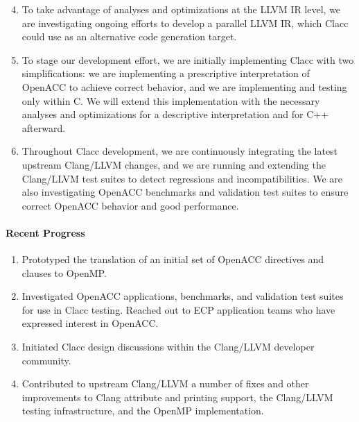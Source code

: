 \begin{enumerate}

\setcounter{enumi}{3}

\item To take advantage of analyses and optimizations at the LLVM IR level,
we are investigating ongoing efforts to develop a parallel LLVM IR, which
Clacc could use as an alternative code generation target.

\item To stage our development effort, we are initially implementing Clacc
with two simplifications: we are implementing a prescriptive interpretation
of OpenACC to achieve correct behavior, and we are implementing and testing
only within C.  We will extend this implementation with the necessary
analyses and optimizations for a descriptive interpretation and for C++
afterward.  

\item Throughout Clacc development, we are continuously integrating the
latest upstream Clang/LLVM changes, and we are running and extending the
Clang/LLVM test suites to detect regressions and incompatibilities.  We are
also investigating OpenACC benchmarks \cite{specAccel} and validation test
suites \cite{openACCValidationSuite} to ensure correct OpenACC behavior and
good performance.


\end{enumerate}


\paragraph{Recent Progress}

\begin{enumerate}

\item Prototyped the translation of an initial set of OpenACC directives and
clauses to OpenMP.

\item Investigated OpenACC applications, benchmarks, and validation test
suites for use in Clacc testing.  Reached out to ECP application teams who
have expressed interest in OpenACC.

\item Initiated Clacc design discussions within the Clang/LLVM developer
community.

\item Contributed to upstream Clang/LLVM a number of fixes and other
improvements to Clang attribute and printing support, the Clang/LLVM testing
infrastructure, and the OpenMP implementation.

\end{enumerate}


